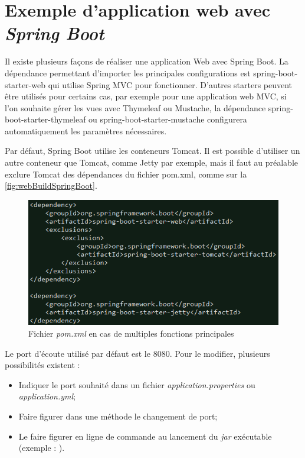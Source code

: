 \documentclass{polytech/polytech}
\begin{document}
\section{Exemple d'application web avec \textit{Spring Boot}}

Il existe plusieurs façons de réaliser une application Web avec Spring Boot. La dépendance permettant d’importer les principales configurations est spring-boot-starter-web qui utilise Spring MVC pour fonctionner. D’autres starters peuvent être utilisés pour certains cas, par exemple pour une application web MVC, si l’on souhaite gérer les vues avec Thymeleaf ou Mustache, la dépendance spring-boot-starter-thymeleaf ou spring-boot-starter-mustache configurera automatiquement les paramètres nécessaires. 

Par défaut, Spring Boot utilise les conteneurs Tomcat. Il est possible d’utiliser un autre conteneur que Tomcat, comme Jetty par exemple, mais il faut au préalable exclure Tomcat des dépendances du fichier pom.xml, comme sur la \autoref{fig:webBuildSpringBoot}.

\begin{figure}
	\includegraphics[scale=0.8]{images/webBuildSpringBoot}
	\caption{Fichier \textit{pom.xml} en cas de multiples fonctions principales}
	\label{fig:webBuildSpringBoot}
\end{figure}

Le port d’écoute utilisé par défaut est le 8080. Pour le modifier, plusieurs possibilités existent :

\begin{itemize}
	\item Indiquer le port souhaité dans un fichier \textit{application.properties} ou \textit{application.yml};
	\item Faire figurer dans une méthode le changement de port;
	\item Le faire figurer en ligne de commande au lancement du \textit{jar} exécutable (exemple : ).
\end{itemize}
\end{document}
